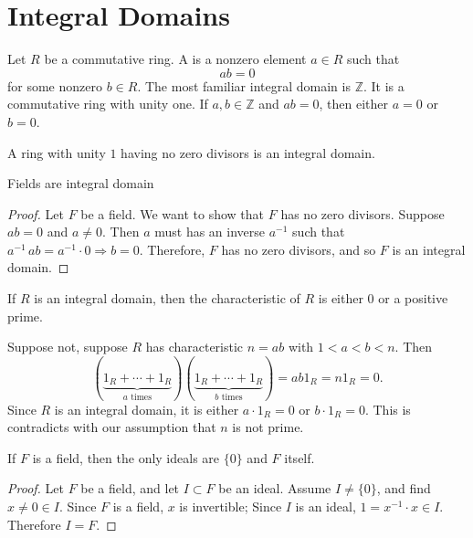 \section{Integral Domains}

Let $R$ be a commutative ring. A  is a nonzero element $a \in R$ such that 
\begin{equation}
    ab=0
\end{equation}
for some nonzero $b \in R$. The most familiar integral domain is $\mathbb{Z}$. It is a 
commutative ring with unity one. If $a, b \in \mathbb{Z}$ and $ab=0$, then either $a=0$ or 
$b=0$.

\begin{definition}
    A ring with unity $1$ having no zero divisors is an integral domain.
\end{definition}

\begin{lemma}
    Fields are integral domain
\end{lemma}
\begin{proof}
    Let $F$ be a field. We want to show that $F$ has no zero divisors. Suppose $ab =0$ and 
    $a \neq 0$. Then $a$ must has an inverse $a^{-1}$ such that $a^{-1}\, a b = a^{-1} \cdot 0 \Longrightarrow b = 0$.
    Therefore, $F$ has no zero divisors, and so $F$ is an integral domain.
\end{proof}

\begin{lemma}
    If $R$ is an integral domain, then the characteristic of $R$ is either $0$ or a positive prime.
\end{lemma}
\begin{solution}
    Suppose not, suppose $R$ has characteristic $n=ab$ with $1 < a < b < n$. Then 
    \[
        (\underbrace{1_R + \cdots + 1_R}_{a \text{ times}})(\underbrace{1_R + \cdots + 1_R}_{b \text{ times}}) 
        = ab1_R = n1_R = 0.
    \]
    Since $R$ is an integral domain, it is either $a \cdot 1_R = 0$ or $b \cdot 1_R = 0$. This is contradicts 
    with our assumption that $n$ is not prime.
\end{solution}


\begin{definition}
    If $F$ is a field, then the only ideals are $\{0\}$ and $F$ itself.
\end{definition}
\begin{proof}
    Let $F$ be a field, and let $I \subset F$ be an ideal. Assume $I \neq \{0 \}$, and find $x \neq 0 \in I$. 
    Since  $F$ is a field, $x$ is invertible; Since $I$ is an ideal, $1 = x^{-1} \cdot x \in I$. Therefore $I = F$.
\end{proof}

